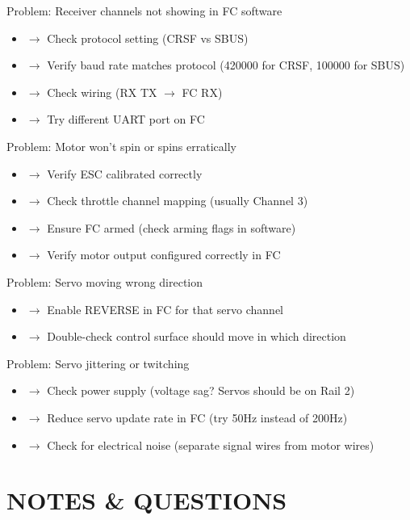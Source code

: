 \documentclass[11pt,letterpaper]{article}
\begin{document}
Problem: Receiver channels not showing in FC software\par

\begin{itemize}
  \item $\rightarrow$ Check protocol setting (CRSF vs SBUS)
  \item $\rightarrow$ Verify baud rate matches protocol (420000 for CRSF, 100000 for SBUS)
  \item $\rightarrow$ Check wiring (RX TX $\rightarrow$ FC RX)
  \item $\rightarrow$ Try different UART port on FC
\end{itemize}

Problem: Motor won't spin or spins erratically\par

\begin{itemize}
  \item $\rightarrow$ Verify ESC calibrated correctly
  \item $\rightarrow$ Check throttle channel mapping (usually Channel 3)
  \item $\rightarrow$ Ensure FC armed (check arming flags in software)
  \item $\rightarrow$ Verify motor output configured correctly in FC
\end{itemize}

Problem: Servo moving wrong direction\par

\begin{itemize}
  \item $\rightarrow$ Enable REVERSE in FC for that servo channel
  \item $\rightarrow$ Double-check control surface should move in which direction
\end{itemize}

Problem: Servo jittering or twitching\par

\begin{itemize}
  \item $\rightarrow$ Check power supply (voltage sag? Servos should be on Rail 2)
  \item $\rightarrow$ Reduce servo update rate in FC (try 50Hz instead of 200Hz)
  \item $\rightarrow$ Check for electrical noise (separate signal wires from motor wires)
\end{itemize}

\section{NOTES \& QUESTIONS}
\end{document}
